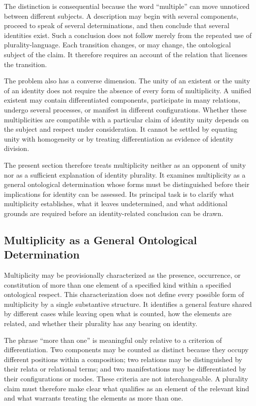 The distinction is consequential because the word ``multiple'' can
move unnoticed between different subjects. A description may begin
with several components, proceed to speak of several determinations,
and then conclude that several identities exist. Such a conclusion
does not follow merely from the repeated use of plurality-language.
Each transition changes, or may change, the ontological subject of
the claim. It therefore requires an account of the relation that
licenses the transition.

The problem also has a converse dimension. The unity of an existent
or the unity of an identity does not require the absence of every
form of multiplicity. A unified existent may contain differentiated
components, participate in many relations, undergo several processes,
or manifest in different configurations. Whether these multiplicities
are compatible with a particular claim of identity unity depends on
the subject and respect under consideration. It cannot be settled by
equating unity with homogeneity or by treating differentiation as
evidence of identity division.

The present section therefore treats multiplicity neither as an
opponent of unity nor as a sufficient explanation of identity
plurality. It examines multiplicity as a general ontological
determination whose forms must be distinguished before their
implications for identity can be assessed. Its principal task is to
clarify what multiplicity establishes, what it leaves undetermined,
and what additional grounds are required before an identity-related
conclusion can be drawn.

\subsection{Multiplicity as a General Ontological Determination}

Multiplicity may be provisionally characterized as the presence,
occurrence, or constitution of more than one element of a specified
kind within a specified ontological respect. This characterization
does not define every possible form of multiplicity by a single
substantive structure. It identifies a general feature shared by
different cases while leaving open what is counted, how the elements
are related, and whether their plurality has any bearing on identity.

The phrase ``more than one'' is meaningful only relative to a
criterion of differentiation. Two components may be counted as
distinct because they occupy different positions within a composition;
two relations may be distinguished by their relata or relational
terms; and two manifestations may be differentiated by their
configurations or modes. These criteria are not interchangeable.
A plurality claim must therefore make clear what qualifies as an
element of the relevant kind and what warrants treating the elements
as more than one.


